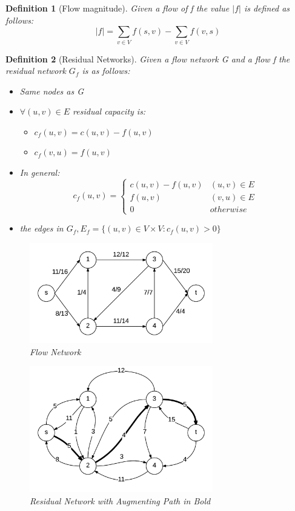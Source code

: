 \documentclass[12pt,letterpaper]{article}
\newtheorem{definition}{Definition}[section]
\begin{document}
\begin{definition}[Flow magnitude]
Given a flow of f the value $|f|$ is defined as follows:
\[|f|=\sum_{v\in V}f(s,v)-\sum_{v\in V}f(v,s)\]
\end{definition}
\begin{definition}[Residual Networks]
Given a flow network G and a flow f the residual network $G_f$ is as follows:
\begin{itemize}
\item Same nodes as G
\item $\forall(u,v)\in E$ residual capacity is:
\begin{itemize}
\item $c_f(u,v)=c(u,v)-f(u,v)$
\item $c_f(v,u)=f(u,v)$
\end{itemize}
\item In general:
\[c_f(u,v)=\begin{cases}c(u,v)-f(u,v) & (u,v)\in E \\ f(u,v) & (v,u)\in E \\ 0 & otherwise \end{cases}\]
\item the edges in $G_f, E_f=\{(u,v)\in V\times V : c_f(u,v)>0\}$
\end{itemize}
\begin{figure}[h]
\centering
\includegraphics[width=8cm]{defflownet}
\caption{Flow Network}
\end{figure}
\begin{figure}[h]
\centering
\includegraphics[width=8cm]{defresnet}
\caption{Residual Network with Augmenting Path in Bold}
\end{figure}
\end{definition}
\end{document}
